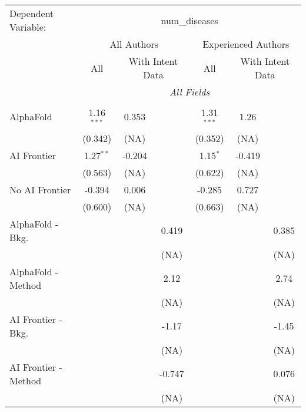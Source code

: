 \begingroup
\centering
\begin{tabular}{lcccccc}
   \tabularnewline \midrule \midrule
   Dependent Variable: & \multicolumn{6}{c}{num\_diseases}\\
 & \multicolumn{3}{c}{All Authors} & \multicolumn{3}{c}{Experienced Authors} \\
\cmidrule(lr){2-4} \cmidrule(lr){5-7}
 & \multicolumn{1}{c}{All} & \multicolumn{2}{c}{With Intent Data} & \multicolumn{1}{c}{All} & \multicolumn{2}{c}{With Intent Data} \\
\cmidrule(lr){2-2} \cmidrule(lr){3-4} \cmidrule(lr){5-5} \cmidrule(lr){6-7}
 & \multicolumn{6}{c}{\textit{All Fields}} \\ \\
   AlphaFold               & 1.16$^{***}$ & 0.353  &        & 1.31$^{***}$ & 1.26   &   \\   
                           & (0.342)      & (NA)   &        & (0.352)      & (NA)   &   \\   
   AI Frontier             & 1.27$^{**}$  & -0.204 &        & 1.15$^{*}$   & -0.419 &   \\   
                           & (0.563)      & (NA)   &        & (0.622)      & (NA)   &   \\   
   No AI Frontier          & -0.394       & 0.006  &        & -0.285       & 0.727  &   \\   
                           & (0.600)      & (NA)   &        & (0.663)      & (NA)   &   \\   
   AlphaFold - Bkg.        &              &        & 0.419  &              &        & 0.385\\   
                           &              &        & (NA)   &              &        & (NA)\\   
   AlphaFold - Method      &              &        & 2.12   &              &        & 2.74\\   
                           &              &        & (NA)   &              &        & (NA)\\   
   AI Frontier - Bkg.      &              &        & -1.17  &              &        & -1.45\\   
                           &              &        & (NA)   &              &        & (NA)\\   
   AI Frontier - Method    &              &        & -0.747 &              &        & 0.076\\   
                           &              &        & (NA)   &              &        & (NA)\\   

\end{tabular}

